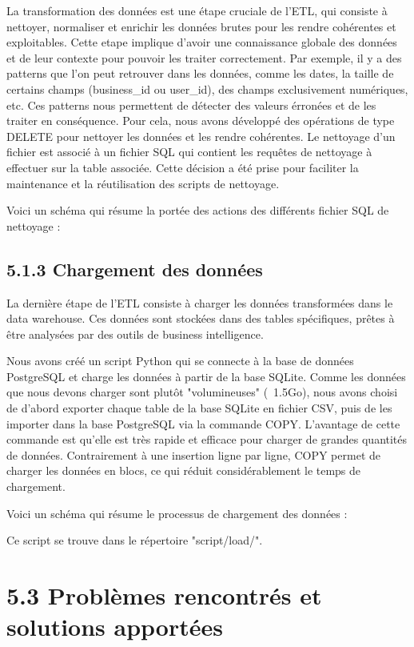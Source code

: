 La transformation des données est une étape cruciale de l’ETL, qui consiste à nettoyer, normaliser et enrichir les données brutes pour les rendre cohérentes et exploitables.
Cette etape implique d'avoir une connaissance globale des données et de leur contexte pour pouvoir les traiter correctement.
Par exemple, il y a des patterns que l'on peut retrouver dans les données, comme les dates, la taille de certains champs (business_id ou user_id), des champs exclusivement numériques, etc.
Ces patterns nous permettent de détecter des valeurs érronées et de les traiter en conséquence.
Pour cela, nous avons développé des opérations de type DELETE pour nettoyer les données et les rendre cohérentes.
Le nettoyage d'un fichier est associé à un fichier SQL qui contient les requêtes de nettoyage à effectuer sur la table associée.
Cette décision a été prise pour faciliter la maintenance et la réutilisation des scripts de nettoyage.

Voici un schéma qui résume la portée des actions des différents fichier SQL de nettoyage :


\subsection{5.1.3 Chargement des données}

La dernière étape de l’ETL consiste à charger les données transformées dans le data warehouse. Ces données sont stockées dans des tables spécifiques, prêtes à être
analysées par des outils de business intelligence.

Nous avons créé un script Python qui se connecte à la base de données PostgreSQL et charge les données à partir de la base SQLite.
Comme les données que nous devons charger sont plutôt "volumineuses" (~1.5Go), nous avons choisi de d'abord exporter chaque table de la base SQLite en fichier CSV, puis de les
importer dans la base PostgreSQL via la commande COPY. L'avantage de cette commande est qu'elle est très rapide et efficace pour charger de grandes quantités de données.
Contrairement à une insertion ligne par ligne, COPY permet de charger les données en blocs, ce qui réduit considérablement le temps de chargement.

Voici un schéma qui résume le processus de chargement des données :

Ce script se trouve dans le répertoire   "script/load/".

\section{5.3 Problèmes rencontrés et solutions apportées}

